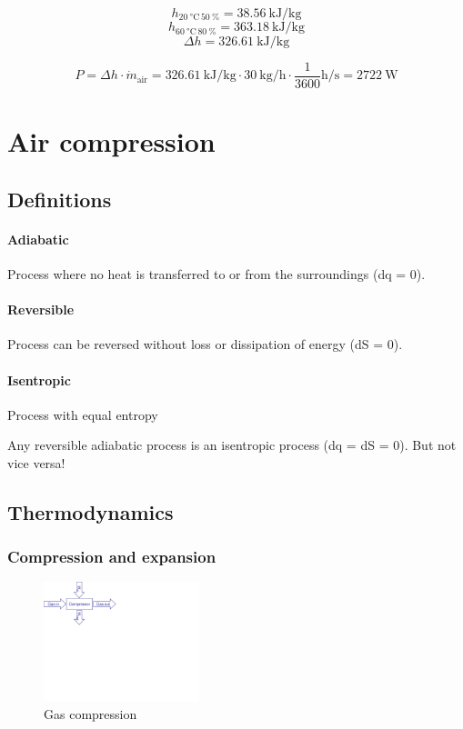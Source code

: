 \documentclass[11pt,a4paper,english,twoside]{scrreprt}
\begin{document}
\[h_{\SI{20}{\degreeCelsius}\,\SI{50}{\percent}}  = \SI{38.56}{\kilo\joule\per\kilogram}\]
\[h_{\SI{60}{\degreeCelsius}\,\SI{80}{\percent}} = \SI{363.18}{\kilo\joule\per\kilogram}\]
\[\Delta h = \SI{326.61}{\kilo\joule\per\kilogram}\]

\[
P=\Delta h\cdot \dot{m}_\text{air}  = \SI{326.61}{\kilo\joule\per\kilogram} \cdot  \SI{30}{\kilo\gram\per\hour}  \cdot  \frac{\num{1}}{\num{3600}}\si{\hour\per\second} = \SI{2722}{\watt}
\]



\section{Air compression}
\label{sec:air_comp}

\subsection{Definitions}


\paragraph{Adiabatic }
Process where no heat is transferred to or from the surroundings (dq = 0).

\paragraph{Reversible}
Process can be reversed without loss or dissipation of energy (dS = 0).

\paragraph{Isentropic}
Process with equal entropy

Any reversible adiabatic process is an isentropic process (dq = dS = 0). But not vice versa!


\subsection{Thermodynamics}

\subsubsection{Compression and expansion}

\begin{figure}
  \centering
  \includegraphics*[width=0.4\textwidth,angle=0]{FCF_Figure_Compressor.pdf}
  \caption[Gas compression]{Gas compression}
  \label{fig:GasCompression}
\end{figure}
\end{document}
